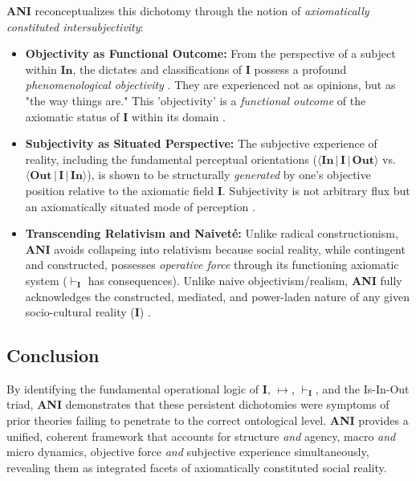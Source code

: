 \documentclass{article}
\newcommand{\ANI}{\textbf{ANI}}             %
\newcommand{\Isness}{\mathbf{I}}            %
\newcommand{\Inness}{\mathbf{In}}           %
\newcommand{\Outness}{\mathbf{Out}}         %
\newcommand{\enactment}{\ensuremath{\mapsto}} %
\newcommand{\validates}[1]{\ensuremath{\vdash_{#1}}} %
\newcommand{\orientation}[3]{\ensuremath{\langle #1 \,|\, #2 \,|\, #3 \rangle}} %
\begin{document}
\ANI{} reconceptualizes this dichotomy through the notion of \textit{axiomatically constituted intersubjectivity}:
\begin{itemize}
    \item \textbf{Objectivity as Functional Outcome:} From the perspective of a subject within $\Inness$, the dictates and classifications of $\Isness$ possess a profound \textit{phenomenological objectivity} \citep{BergerLuckmann1966}. They are experienced not as opinions, but as "the way things are." This 'objectivity' is a \textit{functional outcome} of the axiomatic status of $\Isness$ within its domain \citep{Searle1995}.
    \item \textbf{Subjectivity as Situated Perspective:} The subjective experience of reality, including the fundamental perceptual orientations ($\orientation{\Inness}{\Isness}{\Outness}$ vs. $\orientation{\Outness}{\Isness}{\Inness}$), is shown to be structurally \textit{generated} by one's objective position relative to the axiomatic field $\Isness$. Subjectivity is not arbitrary flux but an axiomatically situated mode of perception \citep{Schutz1967}.
    \item \textbf{Transcending Relativism and Naiveté:} Unlike radical constructionism, \ANI{} avoids collapsing into relativism because social reality, while contingent and constructed, possesses \textit{operative force} through its functioning axiomatic system ($\validates{\Isness}$ has consequences). Unlike naive objectivism/realism, \ANI{} fully acknowledges the constructed, mediated, and power-laden nature of any given socio-cultural reality ($\Isness$) \citep{BergerLuckmann1966, Foucault1972}.
\end{itemize}

\subsection{Conclusion}

By identifying the fundamental operational logic of $\Isness$, $\enactment$, $\validates{\Isness}$, and the Is-In-Out triad, \ANI{} demonstrates that these persistent dichotomies were symptoms of prior theories failing to penetrate to the correct ontological level. \ANI{} provides a unified, coherent framework that accounts for structure \textit{and} agency, macro \textit{and} micro dynamics, objective force \textit{and} subjective experience simultaneously, revealing them as integrated facets of axiomatically constituted social reality.

\end{document}
